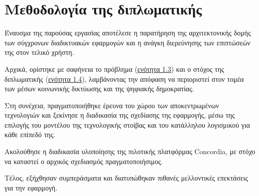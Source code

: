 \section{Μεθοδολογία της διπλωματικής}\label{section:1-5-methodology}

Έναυσμα της παρούσας εργασίας αποτέλεσε η παρατήρηση της αρχιτεκτονικής δομής των σύγχρονων διαδικτυακών εφαρμογών και η ανάγκη διερεύνησης των επιπτώσεών της στον τελικό χρήστη. 

Αρχικά, ορίστηκε με σαφήνεια το πρόβλημα (\hyperref[section:1-3-problem-definition]{ενότητα 1.3}) και ο στόχος της διπλωματικής (\hyperref[section:1-4-thesis-goal]{ενότητα 1.4}), λαμβάνοντας την απόφαση να περιοριστεί στον τομέα των μέσων κοινωνικής δικτύωσης και της ψηφιακής δημοκρατίας.

Στη συνέχεια, πραγματοποιήθηκε έρευνα του χώρου των αποκεντρωμένων τεχνολογιών και ξεκίνησε η διαδικασία της σχεδίασης της εφαρμογής, μέσω της επιλογής του μοντέλου της τεχνολογικής στοίβας και του κατάλληλου λογισμικού για κάθε επίπεδό της.

Ακολούθησε η διαδικασία υλοποίησης της πιλοτικής πλατφόρμας Concordia, με στόχο να καταστεί ο αρχικός σχεδιασμός πραγματοποιήσιμος.

Τέλος, εξήχθησαν συμπεράσματα και διατυπώθηκαν πιθανές μελλοντικές επεκτάσεις για την εφαρμογή.
